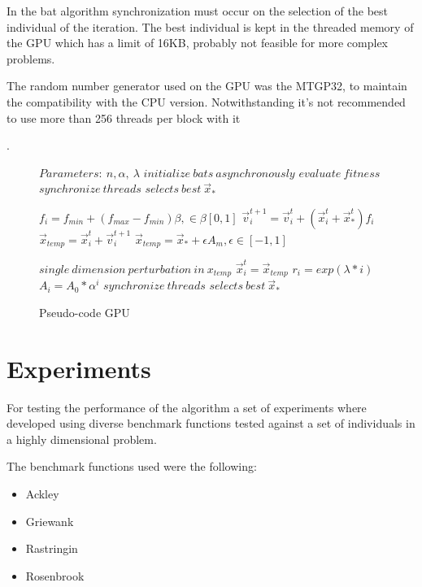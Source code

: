 \documentclass[conference]{IEEEtran}
\begin{document}
In the bat algorithm synchronization must occur on the selection of the
best individual of the iteration. The best individual is kept in the
threaded memory of the GPU which has a limit of 16KB, probably not feasible for
more complex problems.

The random number generator used on the GPU was the MTGP32, to
maintain the compatibility with the CPU version. Notwithstanding
it's not recommended to use more than 256 threads per block with it

\cite{curandIssue}.


\begin{figure}
\begin{algorithmic}[1]
\State $Parameters:\ n,\alpha,\ \lambda$
\State $initialize\ bats\ asynchronously$
\State $evaluate\ fitness$
\State $synchronize\ threads$
\State $selects\ best\ \vec{x}_*$

        \State $f_i=f_{min} + (f_{max} - f_{min})\beta, \in \beta [0,1]$
        \State $\vec{v}_i^{t+1} = \vec{v}_i^{t} + (\vec{x}_i^{t} + \vec{x}_*^{t})f_i$
        \State $\vec{x}_{temp} = \vec{x}_i^{t} + \vec{v}_i^{t+1}$
            \State $\vec{x}_{temp} = \vec{x}_* + \epsilon A_m, \epsilon \in [-1, 1]$
        \EndIf

        \State $single\ dimension\ perturbation\ in\ x_{temp}$
            \State $\vec{x}_i^t = \vec{x}_{temp}$
            \State $r_i = exp(\lambda * i)$
            \State $A_i =  A_{0} * \alpha^i$
        \EndIf
    \EndFor
    \State $synchronize\ threads$
    \State $selects\ best\ \vec{x}_*$
\EndWhile
\end{algorithmic}
\caption{Pseudo-code GPU}\label{gpu-pseudo}
\end{figure}


\section{Experiments} \label{experiments}%

For testing the performance of the algorithm a set of experiments where
developed using diverse benchmark functions tested against a set of
individuals in a highly dimensional problem.

The benchmark functions used were the following:

\begin{itemize}
    \item Ackley
    \item Griewank
    \item Rastringin
    \item Rosenbrook
\end{itemize}
\end{document}
